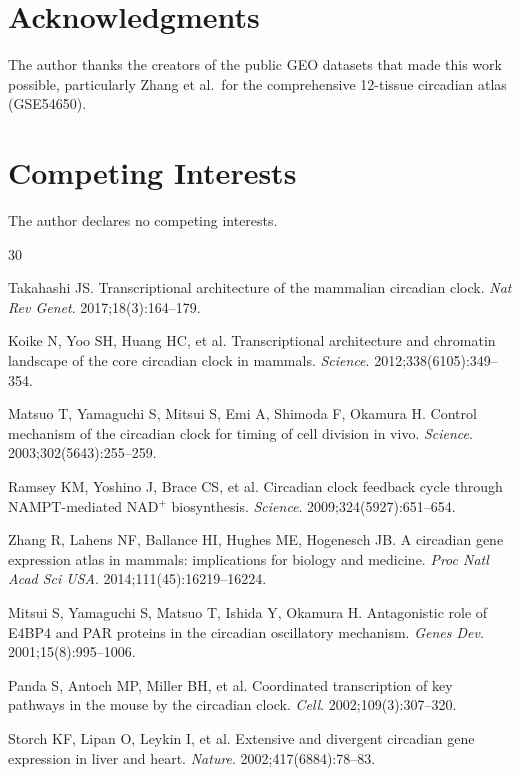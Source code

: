 \documentclass[11pt,letterpaper]{article}
\begin{document}
\section*{Acknowledgments}

The author thanks the creators of the public GEO datasets that made this work possible, particularly Zhang et al.\ for the comprehensive 12-tissue circadian atlas (GSE54650).

\section*{Competing Interests}

The author declares no competing interests.


\begin{thebibliography}{30}

Takahashi JS.
Transcriptional architecture of the mammalian circadian clock.
\textit{Nat Rev Genet}. 2017;18(3):164--179.

Koike N, Yoo SH, Huang HC, et al.
Transcriptional architecture and chromatin landscape of the core circadian clock in mammals.
\textit{Science}. 2012;338(6105):349--354.

Matsuo T, Yamaguchi S, Mitsui S, Emi A, Shimoda F, Okamura H.
Control mechanism of the circadian clock for timing of cell division in vivo.
\textit{Science}. 2003;302(5643):255--259.

Ramsey KM, Yoshino J, Brace CS, et al.
Circadian clock feedback cycle through NAMPT-mediated NAD$^+$ biosynthesis.
\textit{Science}. 2009;324(5927):651--654.

Zhang R, Lahens NF, Ballance HI, Hughes ME, Hogenesch JB.
A circadian gene expression atlas in mammals: implications for biology and medicine.
\textit{Proc Natl Acad Sci USA}. 2014;111(45):16219--16224.

Mitsui S, Yamaguchi S, Matsuo T, Ishida Y, Okamura H.
Antagonistic role of E4BP4 and PAR proteins in the circadian oscillatory mechanism.
\textit{Genes Dev}. 2001;15(8):995--1006.

Panda S, Antoch MP, Miller BH, et al.
Coordinated transcription of key pathways in the mouse by the circadian clock.
\textit{Cell}. 2002;109(3):307--320.

Storch KF, Lipan O, Leykin I, et al.
Extensive and divergent circadian gene expression in liver and heart.
\textit{Nature}. 2002;417(6884):78--83.


\end{thebibliography}
\end{document}
